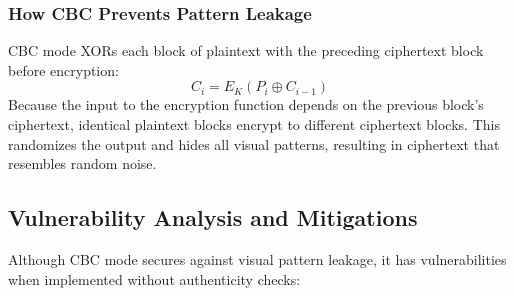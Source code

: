 \documentclass[11pt,a4paper]{article}
\begin{document}
\subsubsection{How CBC Prevents Pattern Leakage}
CBC mode XORs each block of plaintext with the preceding ciphertext block before encryption:
\begin{equation}
    C_i = E_K(P_i \oplus C_{i-1})
\end{equation}
Because the input to the encryption function depends on the previous block's ciphertext, identical plaintext blocks encrypt to different ciphertext blocks. This randomizes the output and hides all visual patterns, resulting in ciphertext that resembles random noise.

\subsection{Vulnerability Analysis and Mitigations}
Although CBC mode secures against visual pattern leakage, it has vulnerabilities when implemented without authenticity checks:
\end{document}
